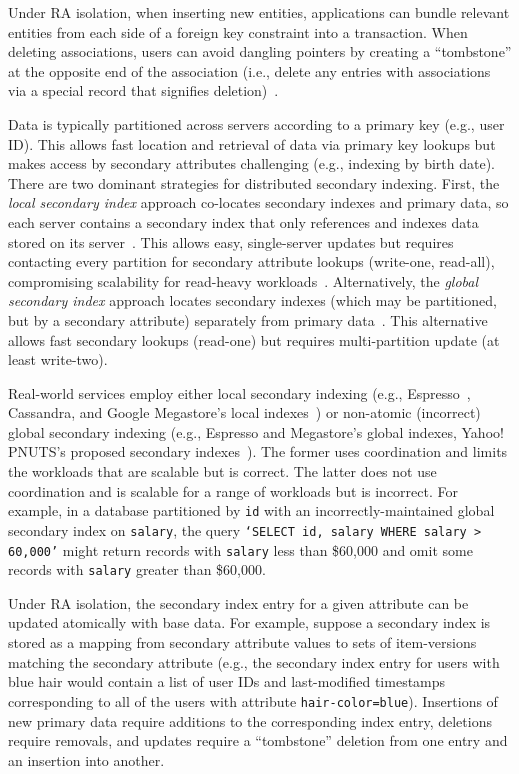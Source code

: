 Under RA isolation, when inserting new entities, applications can
bundle relevant entities from each side of a foreign key constraint
into a transaction. When deleting associations, users can avoid
dangling pointers by creating a ``tombstone'' at the opposite end of
the association (i.e., delete any entries with associations via a
special record that signifies deletion)~\cite{tombstone}.

 Data is typically partitioned across
servers according to a primary key (e.g., user ID). This allows fast
location and retrieval of data via primary key lookups but makes
access by secondary attributes challenging (e.g., indexing by birth date). There
are two dominant strategies for distributed secondary indexing. First,
the \textit{local secondary index} approach co-locates secondary
indexes and primary data, so each server contains a secondary index
that only references and indexes data stored on its
server~\cite{megastore,espresso}. This allows easy, single-server
updates but requires contacting every partition for secondary
attribute lookups (write-one, read-all), compromising scalability for
read-heavy workloads~\cite{tao,spanner,espresso}. Alternatively, the
\textit{global secondary index} approach locates secondary indexes
(which may be partitioned, but by a secondary attribute)
separately from primary data~\cite{pnuts,megastore}. This alternative
allows fast secondary lookups (read-one) but requires multi-partition
update (at least write-two).

Real-world services employ either local secondary indexing (e.g.,
Espresso~\cite{espresso}, Cassandra, and Google Megastore's local
indexes~\cite{megastore}) or non-atomic (incorrect) global secondary
indexing (e.g., Espresso and Megastore's global indexes, Yahoo!
PNUTS's proposed secondary indexes~\cite{pnuts}). The former uses
coordination and limits the workloads that are scalable but is
correct. The latter does not use coordination and is scalable for a
range of workloads but is incorrect. For example, in a database
partitioned by \texttt{id} with an incorrectly-maintained global
secondary index on \texttt{salary}, the query \texttt{`SELECT id,
  salary WHERE salary > 60,000'} might return records with
\texttt{salary} less than \$60,000 and omit some records with
\texttt{salary} greater than \$60,000.

Under RA isolation, the secondary index entry for a given
attribute can be updated atomically with base data. For example, suppose a
secondary index is stored as a mapping from secondary attribute values to
sets of item-versions matching the secondary attribute (e.g., the
secondary index entry for users with blue hair would contain a list of
user IDs and last-modified timestamps corresponding to all of the
users with attribute \texttt{hair-color=blue}). Insertions of new
primary data require additions to the corresponding index entry,
deletions require removals, and updates require a ``tombstone''
deletion from one entry and an insertion into another.

